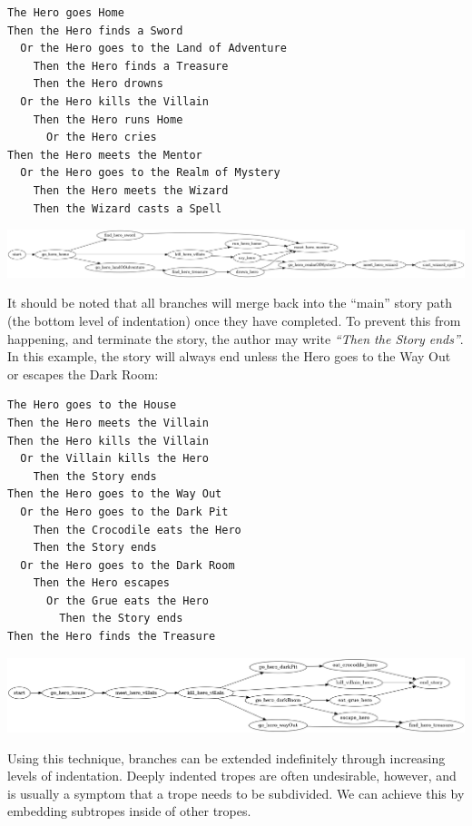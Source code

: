 \documentclass[11pt]{report}
\begin{document}
\begin{lstlisting}[label={lst:branch4}, caption={Extending branches}]
The Hero goes Home
Then the Hero finds a Sword
  Or the Hero goes to the Land of Adventure
    Then the Hero finds a Treasure
    Then the Hero drowns
  Or the Hero kills the Villain
    Then the Hero runs Home
      Or the Hero cries
Then the Hero meets the Mentor
  Or the Hero goes to the Realm of Mystery
    Then the Hero meets the Wizard
    Then the Wizard casts a Spell
\end{lstlisting}

\vspace{7mm}
\centerline{\includegraphics[width=\textwidth]{branch4.png}}
\vspace{7mm}

It should be noted that all branches will merge back into the ``main'' story
path (the bottom level of indentation) once they have completed. To prevent this
from happening, and terminate the story, the author may write \emph{``Then the
  Story ends''}. In this example, the story will always end unless the Hero goes
to the Way Out or escapes the Dark Room:

\begin{lstlisting}[label={lst:branch5}, caption={Terminating branches}]
The Hero goes to the House
Then the Hero meets the Villain
Then the Hero kills the Villain
  Or the Villain kills the Hero
    Then the Story ends
Then the Hero goes to the Way Out
  Or the Hero goes to the Dark Pit
    Then the Crocodile eats the Hero
    Then the Story ends
  Or the Hero goes to the Dark Room
    Then the Hero escapes
      Or the Grue eats the Hero
        Then the Story ends
Then the Hero finds the Treasure
\end{lstlisting}

\vspace{7mm}
\centerline{\includegraphics[width=\textwidth]{branch5.png}}
\vspace{7mm}

Using this technique, branches can be extended indefinitely through increasing
levels of indentation.
Deeply indented tropes are often undesirable, however, and is usually a symptom
that a trope needs to be subdivided. We can achieve this by
embedding subtropes inside of other tropes.
\end{document}
